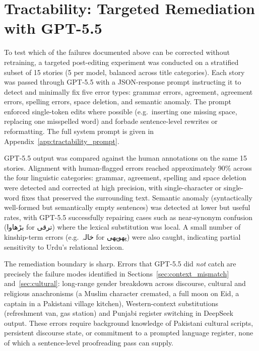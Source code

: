 \documentclass[11pt]{article}
\begin{document}
\section{Tractability: Targeted Remediation with GPT-5.5}
\label{sec:tractability}

To test which of the failures documented above can be
corrected without retraining, a targeted post-editing
experiment was conducted on a stratified subset of 15
stories (5 per model, balanced across title categories).
Each story was passed through GPT-5.5 
with a JSON-response prompt instructing it to detect and
minimally fix five error types: grammar errors,
agreement, agreement errors, spelling errors, space
deletion, and semantic anomaly. The prompt enforced
single-token edits where possible (e.g.\ inserting one
missing space, replacing one misspelled word) and
forbade sentence-level rewrites or reformatting. The
full system prompt is given in
Appendix~\ref{app:tractability_prompt}.

GPT-5.5 output was compared against the human annotations
on the same 15 stories. Alignment with human-flagged
errors reached approximately 90\% across the four
linguistic categories: grammar, agreement, spelling and
space deletion were detected and corrected at high
precision, with single-character or single-word fixes
that preserved the surrounding text. Semantic anomaly
(syntactically well-formed but semantically empty
sentences) was detected at lower but useful rates, with
GPT-5.5 successfully repairing cases such as near-synonym
confusion (\foreignlanguage{arabic}{بڑھاوا} for
\foreignlanguage{arabic}{ترقی}) where the lexical
substitution was local. A small number of kinship-term
errors (e.g.\ \foreignlanguage{arabic}{خالہ} for
\foreignlanguage{arabic}{پھوپھی}) were also caught,
indicating partial sensitivity to Urdu's relational
lexicon.

The remediation boundary is sharp. Errors that GPT-5.5
did \emph{not} catch are precisely the failure modes
identified in
Sections~\ref{sec:context_mismatch} and~\ref{sec:cultural}: 
long-range gender breakdown across discourse, cultural
and religious anachronisms (a Muslim character cremated,
a full moon on Eid, a captain in a Pakistani village
kitchen), Western-context substitutions (refreshment van, gas station) and Punjabi
register switching in DeepSeek output. These errors
require background knowledge of Pakistani cultural
scripts, persistent discourse state, or commitment to a
prompted language register, none of which a sentence-level
proofreading pass can supply.
\end{document}
